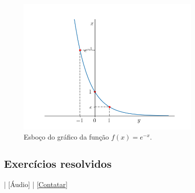 \begin{ex}
\begin{enumerate}[a)]
\begin{figure}[H]
      \includegraphics[width=0.8\textwidth]{./cap_funcao/dados/fig_funexp_e-1/fig}
      \caption{Esboço do gráfico da função $f(x) = e^{-x}$.}
    \end{figure}    
  \end{enumerate}
\end{ex}

\subsection*{Exercícios resolvidos}

\begin{flushright}
  [Vídeo] | [Áudio] | \href{https://phkonzen.github.io/notas/contato.html}{[Contatar]}
\end{flushright}

